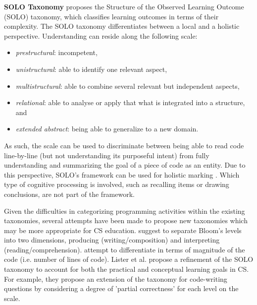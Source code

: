 \noindent \textbf{SOLO Taxonomy}\newline
{} proposes the Structure of the Observed Learning Outcome (SOLO) taxonomy, which classifies learning outcomes in terms of their complexity. The SOLO taxonomy differentiates between a local and a holistic perspective. Understanding can reside along the following scale:
\begin{itemize}
\item \emph{prestructural}: incompetent,
\item \emph{unistructural}: able to identify one relevant aspect,
\item \emph{multistructural}: able to combine several relevant but independent aspects,
\item \emph{relational}: able to analyse or apply that what is integrated into a structure, and
\item \emph{extended abstract}: being able to generalize to a new domain.
\end{itemize}
 As such, the scale can be used to discriminate between being able to read code line-by-line (but not understanding its purposeful intent) from fully understanding and summarizing the goal of a piece of code as an entity. Due to this perspective, SOLO's framework can be used for holistic marking \cite{Fuller2007}. Which type of cognitive processing is involved, such as recalling items or drawing conclusions, are not part of the framework.


Given the difficulties in categorizing programming activities within the existing taxonomies, several attempts have been made to propose new taxonomies which may be more appropriate for CS education.  suggest to separate Bloom’s levels into two dimensions, producing (writing/composition) and interpreting (reading/comprehension).  attempt to differentiate in terms of magnitude of the code (i.e. number of lines of code). Lister et al. \cite{lister2010naturally} propose a refinement of the SOLO taxonomy to account for both the practical and conceptual learning goals in CS. For example, they propose an extension of the taxonomy for code-writing questions by considering a degree of 'partial correctness' for each level on the scale.

